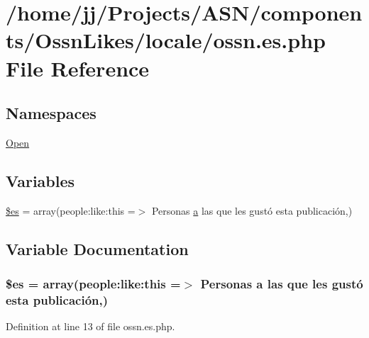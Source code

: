 \hypertarget{components_2_ossn_likes_2locale_2ossn_8es_8php}{}\section{/home/jj/\+Projects/\+A\+S\+N/components/\+Ossn\+Likes/locale/ossn.es.\+php File Reference}
\label{components_2_ossn_likes_2locale_2ossn_8es_8php}
\subsection*{Namespaces}
\begin{DoxyCompactItemize}
\item 
 \hyperlink{namespace_open}{Open}
\end{DoxyCompactItemize}
\subsection*{Variables}
\begin{DoxyCompactItemize}
\item 
\hyperlink{components_2_ossn_likes_2locale_2ossn_8es_8php_a388cbda27103d2baee3997798d1f2744}{\$es} = array(\textquotesingle{}people\+:like\+:this\textquotesingle{} =$>$ \textquotesingle{}Personas \hyperlink{_chart_8min_8js_aef3b685c08bc6c76c8e729bd0e93901d}{a} las que les gustó esta publicación\textquotesingle{},)
\end{DoxyCompactItemize}


\subsection{Variable Documentation}
\subsubsection[{\texorpdfstring{\$es}{$es}}]{\setlength{\rightskip}{0pt plus 5cm}\$es = array(\textquotesingle{}people\+:like\+:this\textquotesingle{} =$>$ \textquotesingle{}Personas {\bf a} las que les gustó esta publicación\textquotesingle{},)}\hypertarget{components_2_ossn_likes_2locale_2ossn_8es_8php_a388cbda27103d2baee3997798d1f2744}{}\label{components_2_ossn_likes_2locale_2ossn_8es_8php_a388cbda27103d2baee3997798d1f2744}


Definition at line 13 of file ossn.\+es.\+php.

